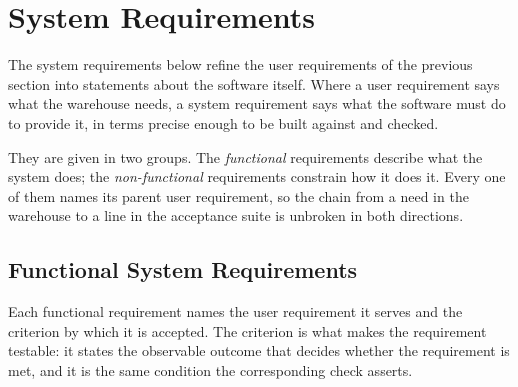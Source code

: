 \documentclass[12pt,a4paper]{report}
\begin{document}
\section{System Requirements}
\label{sec:sysreq}
The system requirements below refine the user requirements of the previous section into statements
about the software itself. Where a user requirement says what the warehouse needs, a system
requirement says what the software must do to provide it, in terms precise enough to be built
against and checked.

They are given in two groups. The \emph{functional} requirements describe what the system does;
the \emph{non-functional} requirements constrain how it does it. Every one of them names its
parent user requirement, so the chain from a need in the warehouse to a line in the acceptance
suite is unbroken in both directions.

\subsection{Functional System Requirements}
Each functional requirement names the user requirement it serves and the criterion by which it is
accepted. The criterion is what makes the requirement testable: it states the observable outcome
that decides whether the requirement is met, and it is the same condition the corresponding check
asserts.
\end{document}
